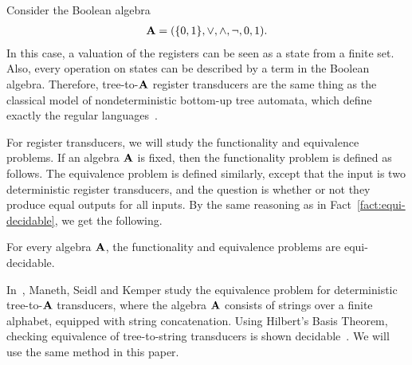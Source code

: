 \begin{example}
    Consider the  Boolean algebra
    \begin{align*}
    \mathbf{A} = (\{0,1\},\lor, \land, \neg, 0, 1).
    \end{align*}
    In this case, a valuation of the registers can be seen as a state from a finite set. Also, every operation on states can be described  by a term in the Boolean algebra. Therefore, tree-to-$\mathbf{A}$ register transducers are the same thing as the classical model of nondeterministic bottom-up tree automata, which define exactly the regular languages~\cite{}. 
\end{example}

For register transducers, we will study the functionality and equivalence problems. If an algebra $\mathbf{A}$ is fixed, then the functionality problem is defined as follows.
The equivalence problem is defined similarly, except that the input is two deterministic register transducers, and the question is whether or not they produce equal outputs for all inputs. By the same reasoning as in Fact~\ref{fact:equi-decidable}, we get the following.
\begin{fact}
    For every algebra $\mathbf{A}$, the functionality and equivalence problems are equi-decidable.
\end{fact}

\begin{example} In~\cite{seidlManethKemper2018}, Maneth, Seidl and Kemper study  the equivalence problem for  deterministic tree-to-$\mathbf{A}$ transducers,  where  the algebra $\mathbf{A}$ consists of strings over a finite alphabet, equipped with string concatenation.  Using Hilbert's Basis Theorem, checking equivalence of tree-to-string transducers is shown decidable~\cite[Corollary 8.2]{seidlManethKemper2018}. We will use the same method in this paper.
\end{example}


